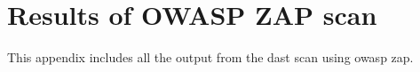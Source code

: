 \chapter{Results of OWASP ZAP scan}
This appendix includes all the output from the \acrshort{dast} scan using \acrshort{owasp} \acrshort{zap}.
\newpage
\label{zap-cli-output}

\newpage
\label{zap-scan-pdf}

%
%
%
%
%